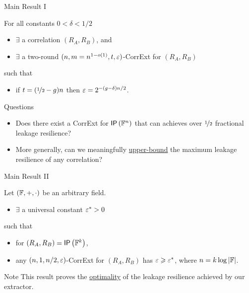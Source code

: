 \begin{frame}{Main Result I}
	\begin{theorem}
	\label{thm:construction}
	For all constants $0<\delta<1/2$
	\begin{itemize}
		\item $ \exists $ a correlation $(R_A,R_B)$, and
		\item $ \exists $ a two-round $(n,m = n^{1-o(1)},t,\varepsilon)$-CorrExt for $(R_A,R_B)$
	\end{itemize}
	such that 
	\begin{itemize}
		\item if $t=(\nicefrac12-g)n$ then $\varepsilon=2^{-(g-\delta)n/2}$.
	\end{itemize} 
	\end{theorem}
	\pause
	{
	\begin{block}{Questions}
		\begin{itemize}
		\item Does there exist a CorrExt for $ \IP[\bbF^n] $ that can achieves over $ \nicefrac{1}{2} $ fractional leakage resilience? \pause
		\item More generally, can we meaningfully \underline{upper-bound} the maximum leakage resilience of any correlation? 
		\end{itemize}
	\end{block}
	}
\end{frame}

\begin{frame}{Main Result II}
	\begin{theorem}
	\label{thm:hardness} 
	Let $({\mathbb F},+,\cdot)$ be an arbitrary field.
	\begin{itemize}
		\item $ \exists $ a universal constant $\varepsilon^*>0$
	\end{itemize}
	such that
	\begin{itemize}
		\item  for $(R_A,R_B)=\IP [\bbF^k] $, %
		\item any $(n,1,%
		n/2,\eps)$-CorrExt for $(R_A,R_B)$ has $\varepsilon\geqslant\varepsilon^*$, where $n=k\log\left\vert{\ensuremath{{\mathbb F}}}\right\vert$.  
	\end{itemize}
\end{theorem}

{
\begin{block}{Note}
	This result proves the \underline{optimality} of the leakage resilience achieved by our extractor.
\end{block}}

\end{frame}